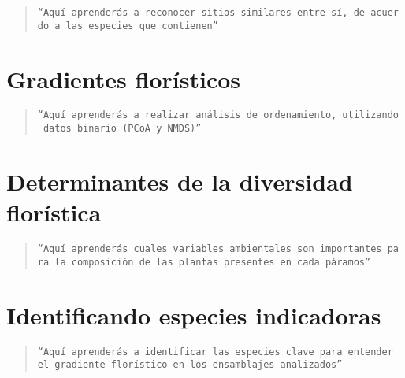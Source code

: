 \documentclass[
]{book}
\begin{document}
\begin{quote}
\texttt{“Aquí\ aprenderás\ a\ reconocer\ sitios\ similares\ entre\ sí,\ de\ acuerdo\ a\ las\ especies\ que\ contienen”}
\end{quote}

\hypertarget{gradientes-floruxedsticos}{%
\section{Gradientes florísticos}\label{gradientes-floruxedsticos}}

\begin{quote}
\texttt{“Aquí\ aprenderás\ a\ realizar\ análisis\ de\ ordenamiento,\ utilizando\ datos\ binario\ (PCoA\ y\ NMDS)”}
\end{quote}

\hypertarget{determinantes-de-la-diversidad-floruxedstica}{%
\section{Determinantes de la diversidad florística}\label{determinantes-de-la-diversidad-floruxedstica}}

\begin{quote}
\texttt{“Aquí\ aprenderás\ cuales\ variables\ ambientales\ son\ importantes\ para\ la\ composición\ de\ las\ plantas\ presentes\ en\ cada\ páramos”}
\end{quote}

\hypertarget{identificando-especies-indicadoras}{%
\section{Identificando especies indicadoras}\label{identificando-especies-indicadoras}}

\begin{quote}
\texttt{“Aquí\ aprenderás\ a\ identificar\ las\ especies\ clave\ para\ entender\ el\ gradiente\ florístico\ en\ los\ ensamblajes\ analizados”}
\end{quote}

  
\end{document}
